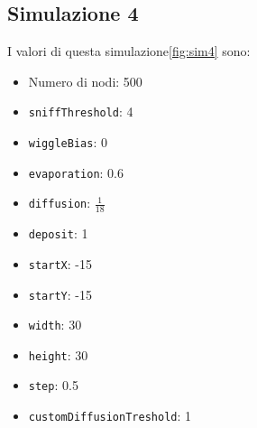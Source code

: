\subsection{Simulazione 4}
I valori di questa simulazione\space \cref{fig:sim4} sono:
\begin{itemize}
    \item Numero di nodi: 500
    \item \texttt{sniffThreshold}: 4
    \item \texttt{wiggleBias}: 0
    \item \texttt{evaporation}: 0.6
    \item \texttt{diffusion}: $\frac{1}{18}$
    \item \texttt{deposit}: 1
    \item \texttt{startX}: -15
    \item \texttt{startY}: -15
    \item \texttt{width}: 30
    \item \texttt{height}: 30
    \item \texttt{step}: 0.5
    \item \texttt{customDiffusionTreshold}: 1
\end{itemize}

